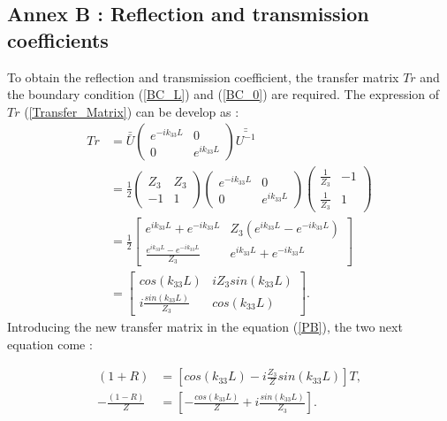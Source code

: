 \documentclass{article}
\begin{document}
\subsection*{Annex B : Reflection and transmission coefficients}
\label{Ann_B}	
    To obtain the reflection and transmission coefficient, the transfer matrix $Tr$ and the boundary condition (\ref{BC_L}) and (\ref{BC_0}) are required.
    The expression of $Tr$ (\ref{Transfer_Matrix}) can be develop as :
     	\begin{align*}
 	Tr &=\bar{\bar{U}} \begin{pmatrix}
                         e^{-ik_{33}L} & 0 \\ 0 & e^{ik_{33}L}
                    \end{pmatrix} \bar{\bar{U^{-1}}}\\
     &= \frac{1}{2} \begin{pmatrix}
     					Z_3 & Z_3 \\ -1 & 1
      				\end{pmatrix} \begin{pmatrix}
                                   	e^{-ik_{33}L} & 0 \\ 0 & e^{ik_{33}L}
                                   \end{pmatrix} \begin{pmatrix}
     												\frac{1}{Z_3} & -1 \\ \frac{1}{Z_3} & 1
      											 \end{pmatrix}\\
    &=\frac{1}{2} \begin{bmatrix}
    				e^{ik_{33}L}+e^{-ik_{33}L} & Z_3(e^{ik_{33}L}-e^{-ik_{33}L}) \\ 
    				\frac{e^{ik_{33}L}-e^{-ik_{33}L}}{Z_3} & e^{ik_{33}L}+e^{-ik_{33}L}
    				\end{bmatrix}\\
 	&= \begin{bmatrix}
    				cos(k_{33}L) & i Z_3 sin(k_{33}L) \\ 
    				i\frac{sin(k_{33}L)}{Z_3} & cos(k_{33}L)
    	\end{bmatrix}.
    \end{align*}
    Introducing the new transfer matrix in the equation (\ref{PB}), the two next equation come :
    
    \begin{align}
    (1+R)&=[cos(k_{33}L)-i\frac{Z_3}{Z} sin(k_{33}L)]T,\label{T_cal1} \\ 
    -\frac{(1-R)}{Z}&=[-\frac{cos(k_{33}L)}{Z}+i\frac{sin(k_{33}L)}{Z_3}].\label{T_cal2}
    \end{align}
    
\end{document}
